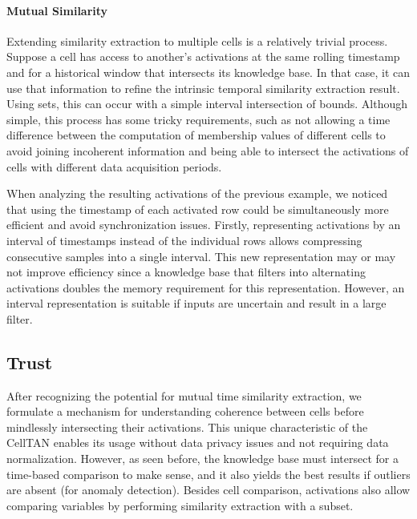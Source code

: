 \paragraph{Mutual Similarity}

Extending similarity extraction to multiple cells is a relatively trivial process. Suppose a cell has access to another's activations at the same rolling timestamp and for a historical window that intersects its knowledge base. In that case, it can use that information to refine the intrinsic temporal similarity extraction result. Using sets, this can occur with a simple interval intersection of bounds. Although simple, this process has some tricky requirements, such as not allowing a time difference between the computation of membership values of different cells to avoid joining incoherent information and being able to intersect the activations of cells with different data acquisition periods.


When analyzing the resulting activations of the previous example, we noticed that using the timestamp of each activated row could be simultaneously more efficient and avoid synchronization issues. Firstly, representing activations by an interval of timestamps instead of the individual rows allows compressing consecutive samples into a single interval.
This new representation may or may not improve efficiency since a knowledge base that filters into alternating activations doubles the memory requirement for this representation. However, an interval representation is suitable if inputs are uncertain and result in a large filter.




\subsection{Trust}  \label{subsec:trust}


After recognizing the potential for mutual time similarity extraction, we formulate a mechanism for understanding coherence between cells before mindlessly intersecting their activations. This unique characteristic of the CellTAN enables its usage without data privacy issues and not requiring data normalization. However, as seen before, the knowledge base must intersect for a time-based comparison to make sense, and it also yields the best results if outliers are absent (for anomaly detection). Besides cell comparison, activations also allow comparing variables by performing similarity extraction with a subset.

